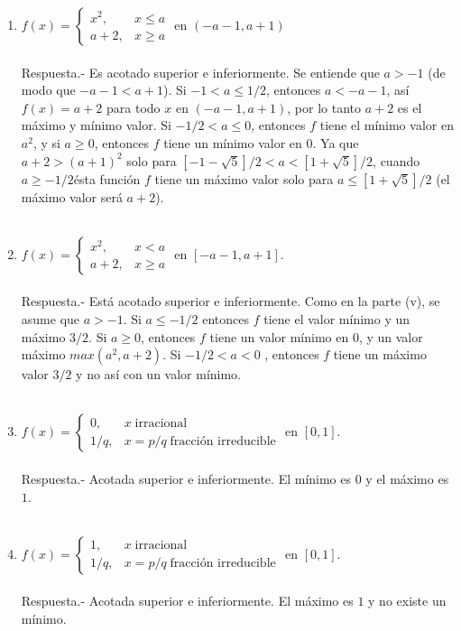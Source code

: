 \begin{enumerate}
\begin{enumerate}[\bfseries (i)]
	\item $f(x) = \left\{\begin{array}{ll} x^2, & x\leq a \\ a+2, & x\geq a \end{array}\right.$ en $(-a-1,a+1)$\\\\
	    Respuesta.-\; Es acotado superior e inferiormente. Se entiende que $a>-1$ (de modo que $-a-1<a+1$). Si $-1<a\leq 1/2$, entonces $a<-a-1$, así $f(x)=a+2$ para todo $x$ en $(-a-1,a+1)$, por lo tanto $a+2$ es el máximo y mínimo valor. Si $-1/2<a\leq 0$, entonces $f$ tiene el mínimo valor en $a^2$, y si $a\geq 0$, entonces $f$ tiene un mínimo valor en $0$. Ya que $a+2>(a+1)^2$ solo para $[-1-\sqrt{5}]/2 < a < [1+\sqrt{5}]/2$, cuando $a\geq -1/2$ésta función $f$ tiene un máximo valor solo para $a\leq [1+\sqrt{5}]/2$ (el máximo valor será $a+2$).\\\\

	\item $f(x) = \left\{\begin{array}{ll}x^2, & x<a \\ a+2, & x\geq a \end{array}\right.$ en $[-a-1,a+1].$\\\\
	    Respuesta.-\; Está acotado superior e inferiormente. Como en la parte (v), se asume que $a>-1$. Si $a\leq -1/2$ entonces $f$ tiene el valor mínimo y un máximo $3/2$. Si $a\geq 0$, entonces $f$ tiene un valor mínimo en $0$, y un valor máximo $max(a^2,a+2)$. Si $-1/2<a<0$ , entonces $f$ tiene un máximo valor $3/2$ y no así con un valor mínimo.\\\\

	\item $f(x) = \left\{\begin{array}{ll} 0,& x\; \mbox{irracional}  \\  1/q,& x=p/q \; \mbox{fracción irreducible} \end{array}\right.$ en $[0,1].$\\\\
	    Respuesta.-\; Acotada superior e inferiormente. El mínimo es $0$ y el máximo es $1$.\\\\

	\item $f(x) = \left\{\begin{array}{rcl}1, & x \; \mbox{irracional} \\ 1/q, & x = p/q \; \mbox{fracción irreducible}\end{array}\right.$ en $[0,1]$.\\\\
	    Respuesta.-\; Acotada superior e inferiormente.  El máximo es $1$ y no existe un mínimo.\\\\


\end{enumerate}
\end{enumerate}

